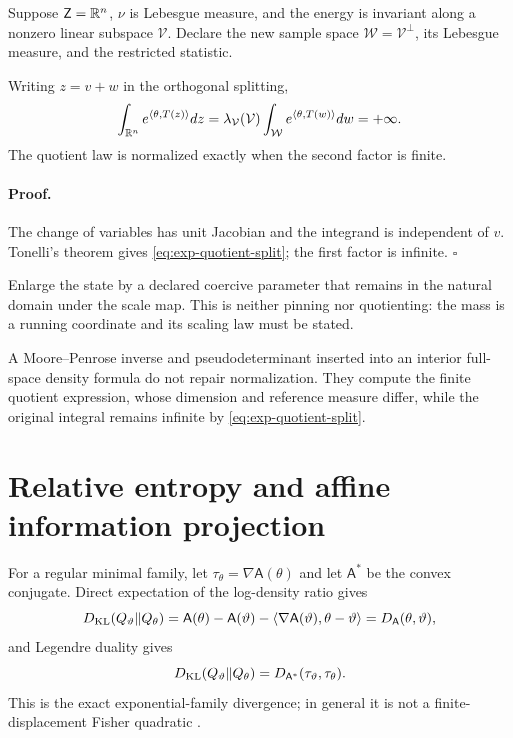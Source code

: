 Suppose \(\mathsf Z=\mathbb R^n\), \(\nu\) is Lebesgue measure, and the energy is
invariant along a nonzero linear subspace \(\mathcal V\). Declare the new
sample space \(\mathcal W=\mathcal V^\perp\), its Lebesgue measure, and the
restricted statistic. 

Writing \(z=v+w\) in the orthogonal splitting,
\begin{equation}
\int_{\mathbb R^n}e^{\langle\theta,T(z)\rangle}dz
=\lambda_{\mathcal V}(\mathcal V)
\int_{\mathcal W}e^{\langle\theta,T(w)\rangle}dw
=+\infty.
\label{eq:exp-quotient-split}
\end{equation}
The quotient law is normalized exactly when the second factor is finite.

\paragraph{Proof.}
The change of variables has unit Jacobian and the integrand is independent of
\(v\). Tonelli's theorem gives \eqref{eq:exp-quotient-split}; the first factor
is infinite. \(\square\)

Enlarge the state by a declared coercive parameter that remains in the
natural domain under the scale map. This is neither pinning nor quotienting:
the mass is a running coordinate and its scaling law must be stated.

A Moore--Penrose inverse and pseudodeterminant inserted into an interior
full-space density formula do not repair normalization. They compute the
finite quotient expression, whose dimension and reference measure differ,
while the original integral remains infinite by
\eqref{eq:exp-quotient-split}. 

\section{Relative entropy and affine information projection}
\label{sec:exp-information-projection}

For a regular minimal family, let
\(\tau_\theta=\nabla\mathsf A(\theta)\) and let
\(\mathsf A^\ast\) be the convex conjugate. Direct expectation of the
log-density ratio gives
\begin{equation}
D_{\mathrm{KL}}(Q_\vartheta\Vert Q_\theta)
=\mathsf A(\theta)-\mathsf A(\vartheta)
-\langle\nabla\mathsf A(\vartheta),\theta-\vartheta\rangle
=D_{\mathsf A}(\theta,\vartheta),
\label{eq:exp-kl-bregman}
\end{equation}
and Legendre duality gives
\begin{equation}
D_{\mathrm{KL}}(Q_\vartheta\Vert Q_\theta)
=D_{\mathsf A^\ast}(\tau_\vartheta,\tau_\theta).
\label{eq:exp-kl-dual-bregman}
\end{equation}
This is the exact exponential-family divergence; in general it is not a
finite-displacement Fisher quadratic
\citep{Csiszar1967,Brown1986,Amari2016}. 

